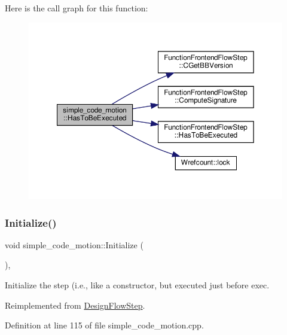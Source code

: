 Here is the call graph for this function\+:
\nopagebreak
\begin{figure}[H]
\begin{center}
\leavevmode
\includegraphics[width=350pt]{d5/d58/classsimple__code__motion_a2b0b3e0ac4c9ad745ef690e183358c5f_cgraph}
\end{center}
\end{figure}
\mbox{\label{classsimple__code__motion_a786374b9d68aa7b714254c22a1220e6c}} 
\subsubsection{\texorpdfstring{Initialize()}{Initialize()}}
{\footnotesize\ttfamily void simple\+\_\+code\+\_\+motion\+::\+Initialize (\begin{DoxyParamCaption}{ }\end{DoxyParamCaption})\hspace{0.3cm}{\ttfamily [override]}, {\ttfamily [virtual]}}



Initialize the step (i.\+e., like a constructor, but executed just before exec. 



Reimplemented from \hyperlink{classDesignFlowStep_a44b50683382a094976e1d432a7784799}{Design\+Flow\+Step}.



Definition at line 115 of file simple\+\_\+code\+\_\+motion.\+cpp.



